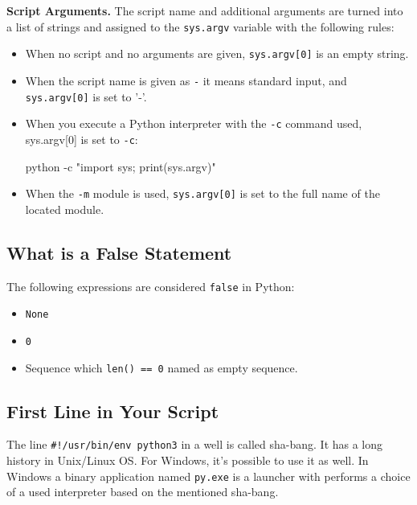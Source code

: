 \documentclass[
]{article}
\newenvironment{Shaded}{}{}
\newcommand{\AttributeTok}[1]{\textcolor[rgb]{0.49,0.56,0.16}{#1}}
\newcommand{\ExtensionTok}[1]{#1}
\newcommand{\StringTok}[1]{\textcolor[rgb]{0.25,0.44,0.63}{#1}}
\begin{document}
\textbf{Script Arguments.} The script name and additional arguments are
turned into a list of strings and assigned to the \texttt{sys.argv}
variable with the following rules:

\begin{itemize}
\item
  When no script and no arguments are given, \texttt{sys.argv{[}0{]}} is
  an empty string.
\item
  When the script name is given as \texttt{-} it means standard input,
  and \texttt{sys.argv{[}0{]}} is set to '-'.
\item
  When you execute a Python interpreter with the \texttt{-c} command
  used, sys.argv{[}0{]} is set to \texttt{-c}:

\begin{Shaded}
\begin{Highlighting}[]
\ExtensionTok{python} \AttributeTok{{-}c} \StringTok{"import sys; print(sys.argv)"}
\end{Highlighting}
\end{Shaded}
\item
  When the \texttt{-m} module is used, \texttt{sys.argv{[}0{]}} is set
  to the full name of the located module.
\end{itemize}

\hypertarget{what-is-a-false-statement}{%
\subsection{What is a False Statement}\label{what-is-a-false-statement}}

The following expressions are considered \texttt{false} in Python:

\begin{itemize}
\item
  \texttt{None}
\item
  \texttt{0}
\item
  Sequence which \texttt{len()\ ==\ 0} named as empty sequence.
\end{itemize}

\hypertarget{first-line-in-your-script}{%
\subsection{First Line in Your Script}\label{first-line-in-your-script}}

The line \texttt{\#!/usr/bin/env\ python3} in a well is called sha-bang.
It has a long history in Unix/Linux OS. For Windows, it's possible to
use it as well. In Windows a binary application named \texttt{py.exe} is
a launcher with performs a choice of a used interpreter based on the
mentioned sha-bang.
\end{document}
